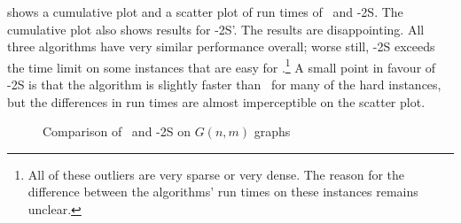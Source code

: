  shows a cumulative plot and a scatter
plot of run times of \McSplit\ and \McSplit-2S.  The cumulative plot also shows
results for \McSplit-2S'.  The results are disappointing. All three
algorithms have very similar performance overall;
worse still, \McSplit-2S exceeds the time limit on some instances that are
easy for \McSplit.\footnote{All of these outliers are very sparse or very dense.
The reason for the difference between the algorithms' run times on these instances
remains unclear.}
A small point in favour of \McSplit-2S is that the algorithm is
slightly faster than \McSplit\ for many of the hard instances,
but the differences in run times are almost imperceptible on the scatter plot.  

\begin{figure}[htb]
    \centering
    \caption{Comparison of \McSplit\ and \McSplit-2S on $G(n,m)$ graphs}
    \label{figure:mcsplit-vs-mcsplit2-gnm}
\end{figure}

